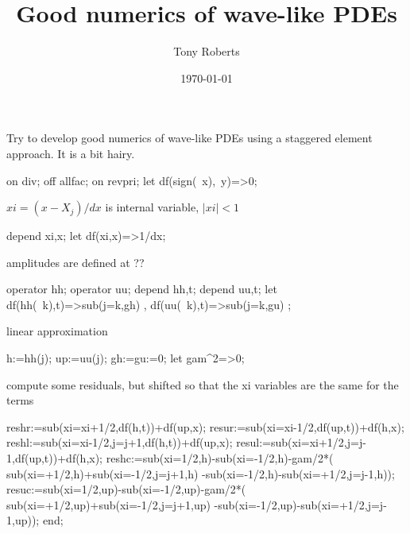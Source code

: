 \documentclass[11pt,a5paper]{article}
\title{Good numerics of wave-like PDEs}
\author{Tony Roberts}
\date{\today}
\begin{document}
\maketitle

Try to develop good numerics of wave-like PDEs using
a staggered element approach.  It is a bit hairy. 


\begin{reduce}
on div; off allfac; on revpri;
let df(sign(~x),~y)=>0;
\end{reduce}
$xi=(x-X_j)/dx$ is internal variable, $|xi|<1$
\begin{reduce}
depend xi,x;  let df(xi,x)=>1/dx;
\end{reduce}
amplitudes are defined at ??
\begin{reduce}
operator hh; operator uu;
depend hh,t; depend uu,t;
let { df(hh(~k),t)=>sub(j=k,gh)
    , df(uu(~k),t)=>sub(j=k,gu)
    };
\end{reduce}
linear approximation
\begin{reduce}
h:=hh(j); up:=uu(j);
gh:=gu:=0;
let gam^2=>0;
\end{reduce}
compute some residuals, but shifted so that the xi
variables are the same for the terms
\begin{reduce}
reshr:=sub(xi=xi+1/2,df(h,t))+df(up,x);
resur:=sub(xi=xi-1/2,df(up,t))+df(h,x);
reshl:=sub({xi=xi-1/2,j=j+1},df(h,t))+df(up,x);
resul:=sub({xi=xi+1/2,j=j-1},df(up,t))+df(h,x);
reshc:=sub(xi=1/2,h)-sub(xi=-1/2,h)-gam/2*(
     sub(xi=+1/2,h)+sub({xi=-1/2,j=j+1},h)
    -sub(xi=-1/2,h)-sub({xi=+1/2,j=j-1},h));
resuc:=sub(xi=1/2,up)-sub(xi=-1/2,up)-gam/2*(
     sub(xi=+1/2,up)+sub({xi=-1/2,j=j+1},up)
    -sub(xi=-1/2,up)-sub({xi=+1/2,j=j-1},up));
end;
\end{reduce}
\end{document}
